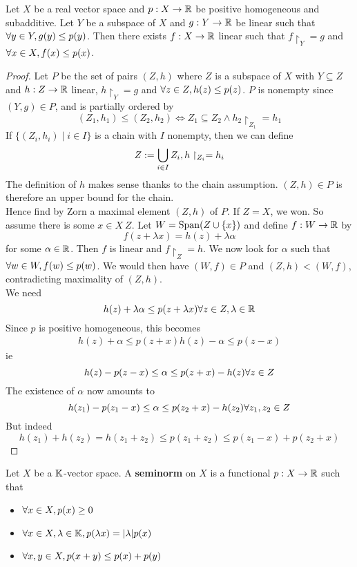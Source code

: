 \documentclass{article}
\begin{document}
\begin{nthm}\label{thm:hb-positive}
  Let $X$ be a real vector space and $p : X \rightarrow \mathbb R$ be positive homogeneous and subadditive. Let $Y$ be a subspace of $X$ and $g : Y \rightarrow \mathbb R$ be linear such that $\forall y \in Y, g(y) \le p(y)$. Then there exists $f : X \rightarrow \mathbb R$ linear such that $f\restriction_Y = g$ and $\forall x \in X, f(x) \le p(x)$.
\end{nthm}
\begin{proof}
  Let $P$ be the set of pairs $(Z, h)$ where $Z$ is a subspace of $X$ with $Y \subseteq Z$ and $h : Z \rightarrow \mathbb R$ linear, $h\restriction_Y = g$ and $\forall z \in Z, h(z) \le p(z)$. $P$ is nonempty since $(Y, g) \in P$, and is partially ordered by
  $$(Z_1, h_1) \le (Z_2, h_2) \iff Z_1 \subseteq Z_2 \land h_2\restriction_{Z_1} = h_1$$
  If $\{(Z_i, h_i) \mid i \in I\}$ is a chain with $I$ nonempty, then we can define
  $$Z := \bigcup_{i \in I} Z_i, h\restriction_{Z_i} = h_i$$
  The definition of $h$ makes sense thanks to the chain assumption. $(Z, h) \in P$ is therefore an upper bound for the chain. \\
  Hence find by Zorn a maximal element $(Z, h)$ of $P$. If $Z = X$, we won. So assume there is some $x \in X \ Z$. Let $W = \mathrm{Span}(Z \cup \{x\})$ and define $f : W \rightarrow \mathbb R$ by
  $$f(z + \lambda x) = h(z) + \lambda\alpha$$
  for some $\alpha \in \mathbb R$. Then $f$ is linear and $f\restriction_Z = h$. We now look for $\alpha$ such that $\forall w \in W, f(w) \le p(w)$. We would then have $(W, f) \in P$ and $(Z, h) < (W, f)$, contradicting maximality of $(Z, h)$. \\
  We need
  $$h(z) + \lambda\alpha \le p(z + \lambda x) \forall z \in Z, \lambda \in \mathbb R$$
  Since $p$ is positive homogeneous, this becomes
  \begin{align}
    h(z) + \alpha \le p(z + x)
    h(z) - \alpha \le p(z - x)
  \end{align}
  ie
  $$h(z) - p(z - x) \le \alpha \le p(z + x) - h(z) \forall z \in Z$$
  The existence of $\alpha$ now amounts to
  $$h(z_1) - p(z_1 - x) \le \alpha \le p(z_2 + x) - h(z_2) \forall z_1, z_2 \in Z$$
  But indeed
  $$h(z_1) + h(z_2) = h(z_1 + z_2) \le p(z_1 + z_2) \le p(z_1 - x) + p(z_2 + x)$$
\end{proof}

\begin{defi}
  Let $X$ be a $\mathbb K$-vector space. A {\bf seminorm} on $X$ is a functional $p : X \rightarrow \mathbb R$ such that
  \begin{itemize}
    \item $\forall x \in X, p(x) \ge 0$
    \item $\forall x \in X, \lambda \in \mathbb K, p(\lambda x) = |\lambda| p(x)$
    \item $\forall x, y \in X, p(x + y) \le p(x) + p(y)$
  \end{itemize}
\end{defi}
\end{document}
